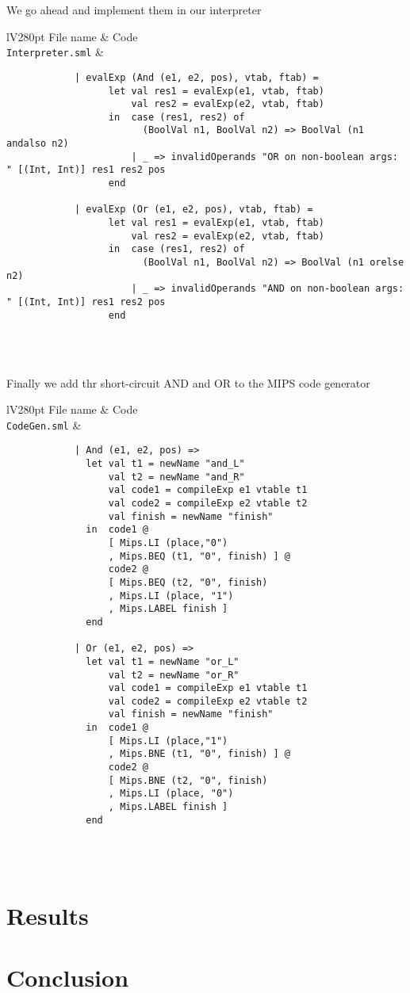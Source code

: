 \documentclass[]{article}
\newcommand{\command}[1]{\texttt{\string#1}}
\begin{document}
We go ahead and implement them in our interpreter

\begin{center}	
	\begin{tabular}{lV{280pt}}
		\toprule
		File name & Code\\
		\midrule
		\command{Interpreter.sml} &
		\begin{verbatim}
			| evalExp (And (e1, e2, pos), vtab, ftab) =
			      let val res1 = evalExp(e1, vtab, ftab)
			          val res2 = evalExp(e2, vtab, ftab)
			      in  case (res1, res2) of
			            (BoolVal n1, BoolVal n2) => BoolVal (n1 andalso n2)
			          | _ => invalidOperands "OR on non-boolean args: " [(Int, Int)] res1 res2 pos
			      end
			  
			| evalExp (Or (e1, e2, pos), vtab, ftab) =
			      let val res1 = evalExp(e1, vtab, ftab)
			          val res2 = evalExp(e2, vtab, ftab)
			      in  case (res1, res2) of
			            (BoolVal n1, BoolVal n2) => BoolVal (n1 orelse n2)
			          | _ => invalidOperands "AND on non-boolean args: " [(Int, Int)] res1 res2 pos
			      end
		\end{verbatim}
		\\
		\bottomrule \\
	\end{tabular}
\end{center}

Finally we add thr short-circuit AND and OR to the MIPS code generator

\begin{center}	
	\begin{tabular}{lV{280pt}}
		\toprule
		File name & Code\\
		\midrule
		\command{CodeGen.sml} &
		\begin{verbatim}
			| And (e1, e2, pos) =>
			  let val t1 = newName "and_L"
			      val t2 = newName "and_R"
			      val code1 = compileExp e1 vtable t1
			      val code2 = compileExp e2 vtable t2
			      val finish = newName "finish"
			  in  code1 @
			      [ Mips.LI (place,"0")
			      , Mips.BEQ (t1, "0", finish) ] @
			      code2 @
			      [ Mips.BEQ (t2, "0", finish)
			      , Mips.LI (place, "1")
			      , Mips.LABEL finish ]
			  end
			
			| Or (e1, e2, pos) =>
			  let val t1 = newName "or_L"
			      val t2 = newName "or_R"
			      val code1 = compileExp e1 vtable t1
			      val code2 = compileExp e2 vtable t2
			      val finish = newName "finish"
			  in  code1 @
			      [ Mips.LI (place,"1")
			      , Mips.BNE (t1, "0", finish) ] @
			      code2 @
			      [ Mips.BNE (t2, "0", finish)
			      , Mips.LI (place, "0")
			      , Mips.LABEL finish ]
			  end
		\end{verbatim}
		\\
		\bottomrule \\
	\end{tabular}
\end{center}

\section{Results}
\section{Conclusion}
\end{document}
